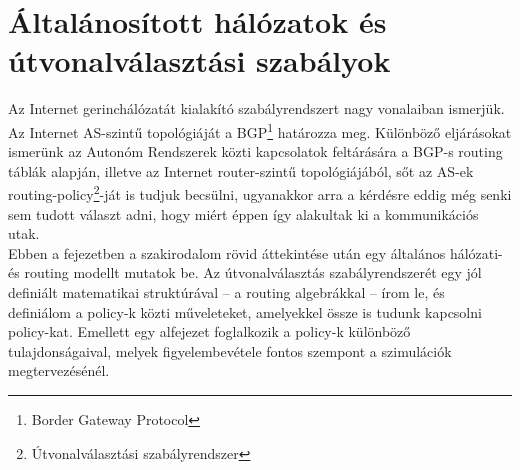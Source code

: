 



\newtheorem{definition}{Definíció}
\newtheorem{conjecture}{Sejtés}
\newtheorem{lemma}{Lemma}
\newtheorem{theorem}{Tétel}
\newtheorem{note}{Megjegyzés}




\chapter{Általánosított hálózatok és útvonalválasztási szabályok}\label{modell}

Az Internet gerinchálózatát kialakító szabályrendszert nagy vonalaiban ismerjük. Az Internet AS-szintű topológiáját a BGP\footnote{Border Gateway Protocol} határozza meg. Különböző eljárásokat ismerünk az Autonóm Rendszerek közti kapcsolatok feltárására a BGP-s routing táblák alapján, illetve az Internet router-szintű topológiájából, sőt az AS-ek routing-policy\footnote{Útvonalválasztási szabályrendszer}-ját is tudjuk becsülni, ugyanakkor arra a kérdésre eddig még senki sem tudott választ adni, hogy miért éppen így alakultak ki a kommunikációs utak.\\

Ebben a fejezetben a szakirodalom rövid áttekintése után egy általános hálózati- és routing modellt mutatok be. Az útvonalválasztás szabályrendszerét egy jól definiált matematikai struktúrával -- a routing algebrákkal -- írom le, és definiálom a policy-k közti műveleteket, amelyekkel össze is tudunk kapcsolni policy-kat. Emellett egy alfejezet foglalkozik a policy-k különböző tulajdonságaival, melyek figyelembevétele fontos szempont a szimulációk megtervezésénél.

